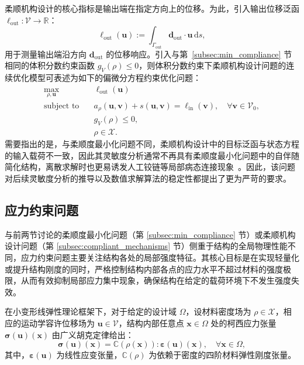 柔顺机构设计的核心指标是输出端在指定方向上的位移。为此，引入输出位移泛函 $\ell_{\mathrm{out}}:\mathcal{V}\to\mathbb{R}$：
\[
\ell_{\mathrm{out}}(\boldsymbol{u}) := \int_{\Gamma_{\mathrm{out}}}\boldsymbol{d}_{\mathrm{out}}\cdot\boldsymbol{u}\,\mathrm{d}s,
\]
用于测量输出端沿方向 $\boldsymbol{d}_{\mathrm{out}}$ 的位移响应。引入与第~\ref{subsec:min_compliance} 节相同的体积分数约束函数 $g_V(\rho)\leq0$，则体积分数约束下柔顺机构设计问题的连续优化模型可表述为如下的偏微分方程约束优化问题：
\begin{equation} \label{eq:ch6_compliant_mechanism_problem}
	\begin{aligned} 
		\max_{\rho,\boldsymbol{u}}\quad & \ell_{\mathrm{out}}(\boldsymbol{u})\\[0.3em] 
		\text{subject to}\quad & a_\rho(\boldsymbol{u},\boldsymbol{v}) + s(\boldsymbol{u},\boldsymbol{v}) = \ell_{\mathrm{in}}(\boldsymbol{v}),\quad \forall \boldsymbol{v}\in\mathcal{V}_0,\\[0.2em] 
		& g_V(\rho)\le 0,\\[0.2em] 
		& \rho\in\mathcal{X}. 
	\end{aligned}
\end{equation}
需要指出的是，与柔顺度最小化问题不同，柔顺机构设计中的目标泛函与状态方程的输入载荷不一致，因此其灵敏度分析通常不再具有柔顺度最小化问题中的自伴随简化结构，离散求解时也更易诱发人工铰链等局部病态连接现象~\cite{sigmundDesignCompliantMechanisms1997a}。因此，该问题对后续灵敏度分析的推导以及数值求解算法的稳定性都提出了更为严苛的要求。


\subsection{应力约束问题}
\label{subsec:stress_constrained}

与前两节讨论的柔顺度最小化问题（第 \ref{subsec:min_compliance} 节）或柔顺机构设计问题（第 \ref{subsec:compliant_mechanisms} 节）侧重于结构的全局物理性能不同，应力约束问题主要关注结构各处的局部强度特征。其核心目标是在实现轻量化或提升结构刚度的同时，严格控制结构内部各点的应力水平不超过材料的强度极限，从而有效抑制局部应力集中现象，确保结构在给定的载荷环境下不发生强度失效。

在小变形线弹性理论框架下，对于给定的设计域 $\Omega$，设材料密度场为 $\rho\in\mathcal{X}$，相应的运动学容许位移场为 $\boldsymbol{u}\in\mathcal{V}$，结构内部任意点 $\boldsymbol{x}\in\Omega$ 处的柯西应力张量 $\boldsymbol{\sigma}(\boldsymbol{u})(\boldsymbol{x})$ 由广义胡克定律给出：
\[
\boldsymbol{\sigma}(\boldsymbol{u})(\boldsymbol{x}) = \mathbb{C}(\rho(\boldsymbol{x})):\boldsymbol{\varepsilon}(\boldsymbol{u})(\boldsymbol{x}), \quad \forall\boldsymbol{x}\in\Omega,
\]
其中，$\boldsymbol{\varepsilon}(\boldsymbol{u})$ 为线性应变张量，$\mathbb{C}(\rho)$ 为依赖于密度的四阶材料弹性刚度张量。

